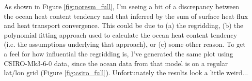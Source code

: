 As shown in Figure \ref{fig:noresm_full}, I'm seeing a bit of a discrepancy between the ocean heat content tendency and that inferred by the sum of surface heat flux and heat transport convergence. This could be due to (a) the regridding, (b) the polynomial fitting approach used to calculate the ocean heat content tendency (i.e. the assumptions underlying that approach), or (c) some other reason. To get a feel for how influential the regridding is, I've generated the same plot using CSIRO-Mk3-6-0 data, since the ocean data from that model is on a regular lat/lon grid (Figure \ref{fig:csiro_full}). Unfortunately the results look a little weird...